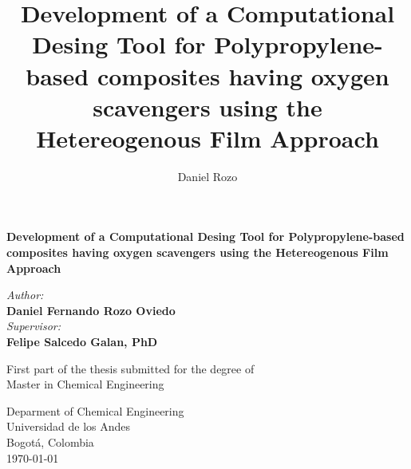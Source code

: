 \documentclass[twoside]{article}
\title{Development of a Computational Desing Tool for Polypropylene-based composites having oxygen scavengers using the Hetereogenous Film Approach}
\author{Daniel Rozo}
\date{\Today}
\begin{document}
\begin{titlepage}
\begin{center}
\BgThispage
        \huge
        \textbf{Development of a Computational Desing Tool for Polypropylene-based composites having oxygen scavengers using the Hetereogenous Film Approach}
        
        \vspace{1cm}
        \LARGE

        \vspace{4cm}
        \textit{Author:}\\
        \textbf{Daniel Fernando Rozo Oviedo}\\
        \vspace{1.5cm}
        \textit{Supervisor:}\\
        \textbf{Felipe Salcedo Galan, PhD}
        \vfill
 
        First part of the thesis submitted for the degree of\\ Master in Chemical Engineering
        
 
        \vspace{1cm}
 
        
 
        \Large
        Deparment of Chemical Engineering\\
        Universidad de los Andes\\
        Bogotá, Colombia\\
        \today
 
    \end{center}
\afterpage{\null\newpage}


\end{titlepage}


\vspace{\fill}
\pagebreak
\null\vspace{\fill}
\tableofcontents
\vspace{\fill}
\pagebreak

\end{document}
